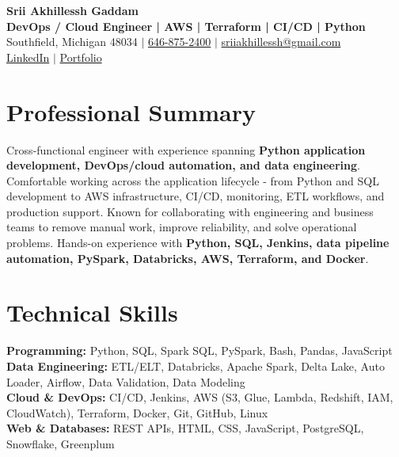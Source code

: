 \documentclass[letterpaper,10pt]{article}
\begin{document}
\fontsize{9.35pt}{10.45pt}\selectfont

\begin{center}
    {\LARGE \textbf{Srii Akhillessh Gaddam}} \\[-1pt]
    \textbf{DevOps / Cloud Engineer | AWS | Terraform | CI/CD | Python} \\[2pt]
    Southfield, Michigan 48034 $|$
    \href{tel:6468752400}{646-875-2400} $|$
    \href{mailto:sriiakhillessh@gmail.com}{sriiakhillessh@gmail.com} \\[1pt]
    \href{https://www.linkedin.com/in/srii-akhiilessh-gaddam-b48668191/}{LinkedIn} $|$
    \href{https://sriiakhillesshg.github.io/portfolio/}{Portfolio}
\end{center}
\vspace{-8pt}

\section{Professional Summary}
\small{Cross-functional engineer with experience spanning \textbf{Python application development, DevOps/cloud automation, and data engineering}. Comfortable working across the application lifecycle - from Python and SQL development to AWS infrastructure, CI/CD, monitoring, ETL workflows, and production support. Known for collaborating with engineering and business teams to remove manual work, improve reliability, and solve operational problems. Hands-on experience with \textbf{Python, SQL, Jenkins, data pipeline automation, PySpark, Databricks, AWS, Terraform, and Docker}.}

\section{Technical Skills}
\small{
\textbf{Programming:} Python, SQL, Spark SQL, PySpark, Bash, Pandas, JavaScript \\
\textbf{Data Engineering:} ETL/ELT, Databricks, Apache Spark, Delta Lake, Auto Loader, Airflow, Data Validation, Data Modeling \\
\textbf{Cloud \& DevOps:} CI/CD, Jenkins, AWS (S3, Glue, Lambda, Redshift, IAM, CloudWatch), Terraform, Docker, Git, GitHub, Linux \\
\textbf{Web \& Databases:} REST APIs, HTML, CSS, JavaScript, PostgreSQL, Snowflake, Greenplum
}
\end{document}
